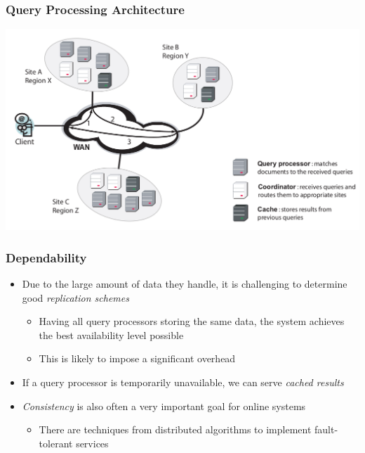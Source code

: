 \documentclass{beamer}
\begin{document}
\begin{frame}
    \frametitle{Query Processing Architecture}
    
    \centering
    \includegraphics[width=\textwidth]{distributed}
\end{frame}

\begin{frame}
    \frametitle{Dependability}
    \begin{itemize}
    \item Due to the large amount of data they handle, it is challenging to
        determine good \emph{replication schemes}
        \begin{itemize}
        \item Having all query processors storing the same data, the system
            achieves the best availability level possible
        \item This is likely to impose a significant overhead
        \end{itemize}
    \item If a query processor is temporarily unavailable, we can serve
        \emph{cached results}
    \item \emph{Consistency} is also often a very important goal for online
        systems
        \begin{itemize}
        \item There are techniques from distributed algorithms to implement
            fault-tolerant services
        \end{itemize}
    \end{itemize}
\end{frame}
\end{document}

